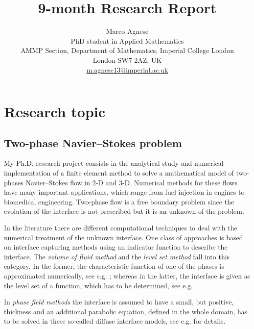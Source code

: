 \documentclass[a4paper,11pt, onecolumn]{article}
\newcommand{\cor}[1]{\textit{#1}} %
\begin{document}
\title{9-month Research Report}
\author{
Marco Agnese \\
PhD student in Applied Mathematics \\
AMMP Section, Department of Mathematics, Imperial College London \\
London SW7 2AZ, UK \\
\url{m.agnese13@imperial.ac.uk}
}
\date{}
\maketitle

\section{Research topic}

\subsection{Two-phase Navier--Stokes problem}

My Ph.D. research project consists in the analytical study and numerical
implementation of a finite element method to solve a mathematical model of
two-phases Navier--Stokes flow in 2-D and 3-D. Numerical methods for these flows
have many important applications, which range from fuel injection in engines to
biomedical engineering. Two-phase flow is a free boundary problem since the
evolution of the interface is not prescribed but it is an unknown of the
problem.
\newline

In the literature there are different computational techniques to deal
with the numerical treatment of the unknown interface. One class of approaches
is based on interface capturing methods using an indicator function to describe
the interface. The \cor{volume of fluid method} and the \cor{level set method}
fall into this category. In the former, the characteristic function of one of
the phases is approximated numerically, see e.g.
\cite{HirtN81,RenardyR02,Popinet09}; whereas in the latter, the interface is
given as the level set of a function, which has to be determined, see e.g.
\cite{GrossR07}.

In \cor{phase field methods} the interface is assumed to have a small,
but positive, thickness and an additional parabolic equation, defined in the
whole domain, has to be solved in these so-called diffuse interface models, see
e.g. \cite{HohenbergH77,AndersonMW98,LowengrubT98,Feng06,KaySW08,AbelsGG12} for
details.
\end{document}
